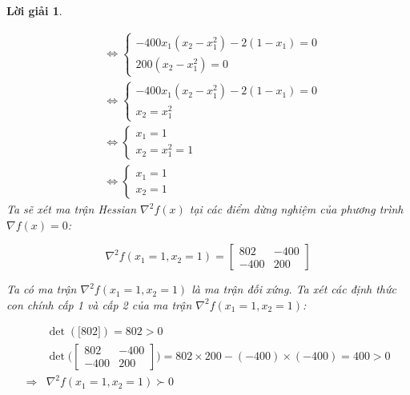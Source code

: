 \documentclass[14pt, a4paper]{article}
\theoremstyle{sltheorem}
\theoremstyle{soltheorem}
\newtheorem*{loigiai}{Lời giải}
\begin{document}
\begin{loigiai}
\begin{enumerate} [wide, labelwidth=!, labelindent=0pt,label=\textbf{\arabic*}.]
            \begin{equation*}
                \begin{aligned}
                    &\Leftrightarrow\begin{cases} -400x_1(x_2 - x_1^2) -2(1-x_1) = 0 \\ 200(x_2 - x_1^2) = 0 \end{cases} \\
                    &\Leftrightarrow \begin{cases} -400x_1(x_2 - x_1^2) -2(1-x_1) = 0 \\ x_2 = x_1^2 \end{cases} \\
                    &\Leftrightarrow \begin{cases} x_1=1 \\ x_2 = x_1^2=1 \end{cases} \\
                    &\Leftrightarrow \begin{cases} x_1=1 \\ x_2=1 \end{cases}
                \end{aligned}
            \end{equation*}
            Ta sẽ xét ma trận Hessian $\nabla^2 f(x)$ tại các điểm dừng nghiệm của phương trình $\nabla f(x) = 0$:

            \begin{equation*}
                \nabla^2 f(x_1=1, x_2=1)=\begin{bmatrix} 802 & -400 \\ -400 & 200 \end{bmatrix}
            \end{equation*}

            Ta có ma trận $\nabla^2 f(x_1=1, x_2=1)$ là ma trận đối xứng. Ta xét các định thức con chính cấp 1 và cấp 2 của ma trận $\nabla^2 f(x_1=1, x_2=1)$:

            \begin{equation*}
                \begin{aligned}
                    &\det(\lbrack 802 \rbrack)=802>0 \\
                    &\det{\Big(\begin{bmatrix} 802 & -400 \\ -400 & 200 \end{bmatrix} \Big)}=802\times200 - (-400)\times(-400)=400>0 \\
                    \Rightarrow&\nabla^2 f(x_1=1, x_2=1) \succ 0
                \end{aligned}
            \end{equation*}


\end{enumerate}
\end{loigiai}
\end{document}
